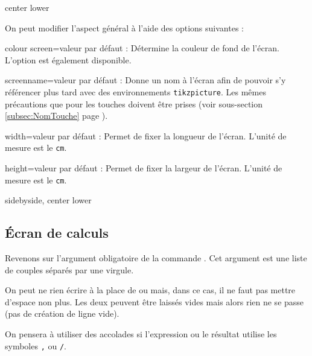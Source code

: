 \documentclass[10pt,french,a4paper]{article}
\newcommand*\Couleur[1]{L'option \docAuxKey{color #1} est également disponible.\xspace}
\begin{document}
\begin{dispExample*}{center lower}
\TiCScreen{}
\end{dispExample*}

On peut modifier l'aspect général à l'aide des options suivantes :

\begin{docKey}{colour screen}{=}{valeur par défaut : }
    Détermine la couleur de fond de l'écran. \Couleur{screen}
\end{docKey}

\begin{docKey}{screenname}{=}{valeur par défaut : }
    Donne un nom à l'écran afin de pouvoir s'y référencer plus tard avec des environnements \texttt{tikzpicture}. Les mêmes précautions que pour les touches doivent être prises (voir sous-section \ref{subsec:NomTouche} page \pageref{subsec:NomTouche}).
\end{docKey}

\begin{docKey}{width}{=}{valeur par défaut : }
Permet de fixer la longueur de l'écran. L'unité de mesure est le \texttt{cm}.
\end{docKey}

\begin{docKey}{height}{=}{valeur par défaut : }
Permet de fixer la largeur de l'écran. L'unité de mesure est le \texttt{cm}.
\end{docKey}

\begin{dispExample*}{sidebyside, center lower}
\TiCScreen[width=3, screenname=first]{}
\TiCScreen[width=3, colour screen=blue!50, screenname=second]{}
\end{dispExample*}

\subsection{\'Ecran de calculs}

Revenons sur l'argument obligatoire de la commande . Cet argument est une liste de couples  séparés par une virgule.\par
On peut ne rien écrire à la place de  ou  mais, dans ce cas, il ne faut pas mettre d'espace non plus. Les deux peuvent être laissés vides mais alors rien ne se passe (pas de création de ligne vide).\par
On pensera à utiliser des accolades si l'expression ou le résultat utilise les symboles \texttt{,} ou \texttt{/}.\medbreak
\end{document}
